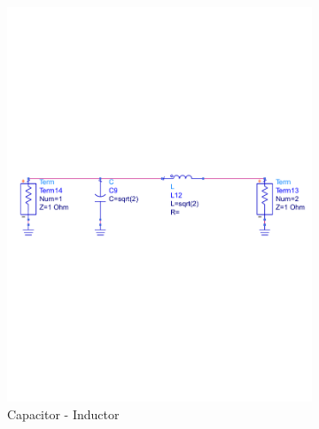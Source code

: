 \documentclass[a4paper]{article}        %
\begin{document}
  \begin{figure}[H]
    \centering
    \begin{subfigure}{0.5\textwidth}
      \centering
      \includegraphics[width=\textwidth]{fig/Filter/2nd_order/proto_1.pdf}
      \caption{Capacitor - Inductor}
      \label{fig:proto_capin}
    \end{subfigure}%
    \begin{subfigure}{0.5\textwidth}
      \centering

\end{subfigure}
\end{figure}
\end{document}
